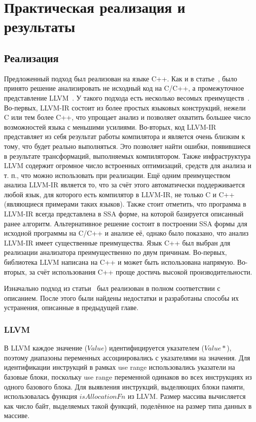 \chapter{Практическая реализация и результаты}

\section{Реализация}

Предложенный подход был реализован на языке C++.  Как и в
статье~\cite{li2010practical}, было принято решение анализировать не
исходный код на C/C++, а промежуточное представление
LLVM~\cite{lattner2004llvm}. У такого подхода есть несколько весомых
преимуществ~\cite{merz2012llbmc}. Во-первых, LLVM-IR состоит из более
простых языковых конструкций, нежели C или тем более C++, что упрощает
анализ и позволяет охватить большее число возможностей языка с
меньшими усилиями. Во-вторых, код LLVM-IR представляет из себя
результат работы компилятора и является очень близким к тому, что
будет реально выполняться. Это позволяет найти ошибки, появившиеся в
результате трансформаций, выполняемых компилятором. Также
инфраструктура LLVM содержит огромное число встроенных оптимизаций,
средств для анализа и т. п., что можно использовать при
реализации. Ещё одним преимуществом анализа LLVM-IR является то, что
за счёт этого автоматически поддерживается любой язык, для которого
есть компилятор в LLVM-IR, не только C и C++ (являющиеся примерами
таких языков). Также стоит отметить, что программа в LLVM-IR всегда
представлена в SSA форме, на которой базируется описанный ранее
алгоритм. Альтернативное решение состоит в построении SSA формы для
исходной программы на C/C++ и анализе её, однако было показано, что
анализ LLVM-IR имеет существенные преимущества. Язык C++ был выбран
для реализации анализатора преимущественно по двум
причинам. Во-первых, библиотека LLVM написана на C++ и может быть
использована напрямую. Во-вторых, за счёт использования C++ проще
достичь высокой производительности.

Изначально подход из статьи~\cite{li2010practical} был реализован в
полном соответствии с описанием. После этого были найдены недостатки и
разработаны способы их устранения, описанные в предыдущей главе.

\subsection{LLVM}

В LLVM каждое значение ($Value$) идентифицируется указателем
($Value *$), поэтому диапазоны переменных ассоциировались с
указателями на значения. Для идентификации инструкций в рамках use
range использовались указатели на базовые блоки, поскольку use range
переменной одинаков во всех инструкциях из одного базового блока. Для
выявления инструкций, выделяющих блоки памяти, использовалась функция
$isAllocationFn$ из LLVM. Размер массива вычисляется как число байт,
выделяемых такой функций, поделённое на размер типа данных в массиве.

